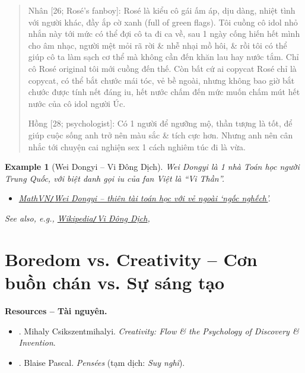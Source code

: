 \documentclass[12pt,oneside]{book}
\newtheorem{example}{Example}
\begin{document}
\begin{quote}
	{\sf Nhân [26; {\sc Rosé}'s fanboy]}: Rosé là kiểu cô gái ấm áp, dịu dàng, nhiệt tình với người khác, đầy ắp cờ xanh (full of green flags). Tôi cuồng cô idol nhỏ nhắn này tới mức có thể đợi cô ta đi ca về, sau 1 ngày cống hiến hết mình cho âm nhạc, người mệt mỏi rã rời \& nhễ nhại mồ hôi, \& rồi tôi có thể giúp cô ta làm sạch cơ thể mà không cần đến khăn lau hay nước tắm. Chỉ cô {\sc Rosé} original tôi mới cuồng đến thế. Còn bất cứ ai copycat Rosé chỉ là copycat, có thể bắt chước mái tóc, vẻ bề ngoài, nhưng không bao giờ bắt chước được tính nết đáng iu, hết nước chấm đến mức muốn chấm mút hết nước của cô idol người Úc.
	
	{\sf Hồng [28; psychologist]}: Có 1 người để ngưỡng mộ, thần tượng là tốt, để giúp cuộc sống anh trở nên màu sắc \& tích cực hơn. Nhưng anh nên cân nhắc tới chuyện cai nghiện sex 1 cách nghiêm túc đi là vừa.
\end{quote}

\begin{example}[{\sc Wei Dongyi -- Vi Đông Dịch}]
	{\sc Wei Dongyi} là 1 nhà Toán học người Trung Quốc, với biệt danh gọi iu của fan Việt là ``Vi Thần''.
	\begin{itemize}
		\item \href{https://www.mathvn.com/2021/07/wei-dongyi-thien-tai-toan-hoc-voi-ve.html}{MathVN{\tt/}{\sc Wei Dongyi} -- thiên tài toán học với vẻ ngoài `ngốc nghếch'}.
	\end{itemize}
	See also, e.g., \href{https://vi.wikipedia.org/wiki/Vi_%C4%90%C3%B4ng_D%E1%BB%8Bch}{Wikipedia{\tt/}{\sc Vi Đông Dịch}}, 
\end{example}


\section{Boredom vs. Creativity -- Cơn buồn chán  vs. Sự sáng tạo}
{\bf \textsf{Resources -- Tài nguyên.}}
\begin{itemize}
	\item \cite{Csikszentmihalyi_creativity}. {\sc Mihaly Csikszentmihalyi}. {\it Creativity: Flow \& the Psychology of Discovery \& Invention}.
	\item \cite{Pascal_pensees}. {\sc Blaise Pascal}. {\it Pens\'ees} (tạm dịch: {\it Suy nghĩ}).
\end{itemize}
\end{document}
